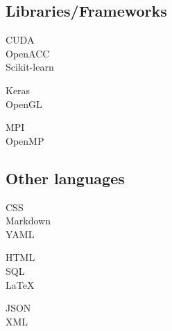 \documentclass[curriculum-vitae-eng]{subfiles}
\begin{document}
		\subsection*{Libraries/Frameworks}
			\begin{minipage}[t]{.3\textwidth}
				CUDA \hfill {}\\
				OpenACC \hfill {}\\
				Scikit-learn \hfill {}\\
			\end{minipage}
			\hfill
			\begin{minipage}[t]{.3\textwidth}
				Keras \hfill {}\\
				OpenGL \hfill {}\\
			\end{minipage}
			\hfill
			\begin{minipage}[t]{.3\textwidth}
				MPI \hfill {}\\
				OpenMP \hfill {}\\
			\end{minipage}
		
		\subsection*{Other languages}
			\begin{minipage}[t]{.3\textwidth}
				CSS \hfill {}\\
				Markdown \hfill {}\\
				YAML \hfill {}\\
			\end{minipage}
			\hfill
			\begin{minipage}[t]{.3\textwidth}
				HTML \hfill {}\\
				SQL \hfill {}\\
				\LaTeX \hfill {}\\
			\end{minipage}
			\hfill
			\begin{minipage}[t]{.3\textwidth}
				JSON \hfill {}\\
				XML \hfill {}\\
			\end{minipage}
		
\end{document}
